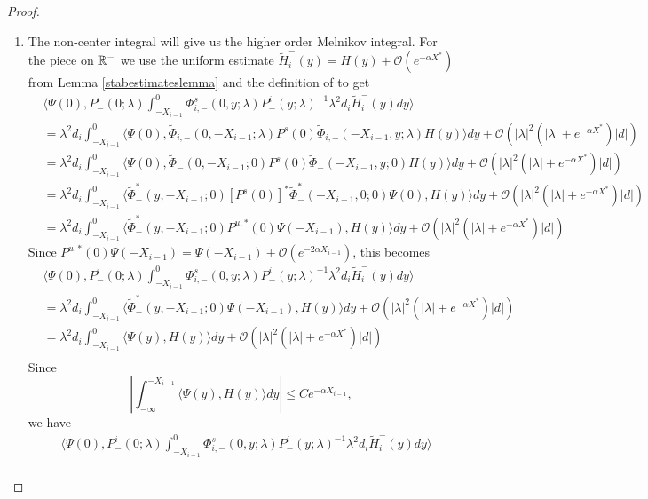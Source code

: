 \documentclass[thesis.tex]{subfiles}
\begin{document}
\begin{lemma}
\begin{proof}
\begin{enumerate}
\item The non-center integral will give us the higher order Melnikov integral. For the piece on $\mathbb{R}^-$ we use the uniform estimate $\tilde{H}_i^-(y) = H(y) + \mathcal{O}(e^{-\alpha X^*})$ from Lemma \ref{stabestimateslemma} and the definition of    to get
\begin{align*}
&\langle \Psi(0), P^i_-(0; \lambda) \int_{-X_{i-1}}^0 \Phi^s_{i,-}(0, y; \lambda) P^i_-(y; \lambda)^{-1} \lambda^2 d_i \tilde{H}_i^-(y) dy \rangle \\
&= \lambda^2 d_i \int_{-X_{i-1}}^0 \langle \Psi(0), \tilde{\Phi}_{i,-}(0, -X_{i-1}; \lambda) 
P^s(0) \tilde{\Phi}_{i,-}(-X_{i-1}, y; \lambda) H(y) \rangle dy + \mathcal{O}(|\lambda|^2( |\lambda| + {e^{-\alpha X^*}})|d|) \\
&= \lambda^2 d_i \int_{-X_{i-1}}^0 \langle \Psi(0), \tilde{\Phi}_-(0, -X_{i-1}; 0) 
P^s(0) \tilde{\Phi}_-(-X_{i-1}, y; 0) H(y) \rangle dy + \mathcal{O}(|\lambda|^2( |\lambda| + {e^{-\alpha X^*}})|d|) \\
&= \lambda^2 d_i \int_{-X_{i-1}}^0 \langle \tilde{\Phi}^*_-(y, -X_{i-1}; 0) [P^s(0)]^* \tilde{\Phi}^*_-(-X_{i-1}, 0; 0) \Psi(0), H(y) \rangle dy + \mathcal{O}(|\lambda|^2( |\lambda| + {e^{-\alpha X^*}})|d|) \\
&= \lambda^2 d_i \int_{-X_{i-1}}^0 \langle \tilde{\Phi}^*_-(y, -X_{i-1}; 0) P^{u,*}(0) \Psi(-X_{i-1}), H(y) \rangle dy + \mathcal{O}(|\lambda|^2( |\lambda| + {e^{-\alpha X^*}})|d|)
\end{align*}
Since $P^{u,*}(0) \Psi(-X_{i-1}) = \Psi(-X_{i-1}) + \mathcal{O}(e^{-2\alpha X_{i-1}})$, this becomes
\begin{align*}
&\langle \Psi(0), P^i_-(0; \lambda) \int_{-X_{i-1}}^0 \Phi^s_{i,-}(0, y; \lambda) P^i_-(y; \lambda)^{-1} \lambda^2 d_i \tilde{H}_i^-(y) dy \rangle \\
&= \lambda^2 d_i \int_{-X_{i-1}}^0 \langle \tilde{\Phi}^*_-(y, -X_{i-1}; 0) \Psi(-X_{i-1}), H(y) \rangle dy + \mathcal{O}(|\lambda|^2( |\lambda| + {e^{-\alpha X^*}})|d|) \\
&= \lambda^2 d_i \int_{-X_{i-1}}^0 \langle \Psi(y), H(y) \rangle dy + \mathcal{O}(|\lambda|^2( |\lambda| + {e^{-\alpha X^*}})|d|) \\
\end{align*}
Since 
\[
\left| \int_{-\infty}^{-X_{i-1}} \langle \Psi(y), H(y) \rangle dy \right| \leq C e^{-\alpha X_{i-1}},
\]
we have
\begin{align*}
&\langle \Psi(0), P^i_-(0; \lambda) \int_{-X_{i-1}}^0 \Phi^s_{i,-}(0, y; \lambda) P^i_-(y; \lambda)^{-1} \lambda^2 d_i \tilde{H}_i^-(y) dy \rangle \\

\end{align*}
\end{enumerate}
\end{proof}
\end{lemma}
\end{document}
